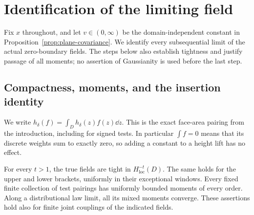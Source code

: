 \section{Identification of the limiting field}
\label{sec:limit}

Fix \(x\) throughout, and let \(v\in(0,\infty)\) be the
domain-independent constant in Proposition~\ref{prop:plane-covariance}.
We identify every subsequential limit of the actual zero-boundary
fields.  The steps below also establish tightness and justify passage
of all moments; no assertion of Gaussianity is used before the last
step.

\subsection{Compactness, moments, and the insertion identity}

We write \(h_\delta(f)=\int_D h_\delta(z)f(z)\dd z\).
This is the exact face-area pairing from the introduction, including
for signed tests.  In particular \(\int f=0\) means that its discrete
weights sum to exactly zero, so adding a constant to a height lift has
no effect.

\begin{proposition}
\label{prop:tightness}
For every \(t>1\), the true fields are tight in
\(H^{-t}_{\mathrm{loc}}(D)\).  The same holds for the upper and lower
brackets, uniformly in their exceptional windows.  Every fixed finite
collection of test pairings has uniformly bounded moments of every
order.  Along a distributional law limit, all its mixed moments
converge.  These assertions hold also for finite joint couplings of
the indicated fields.
\end{proposition}


